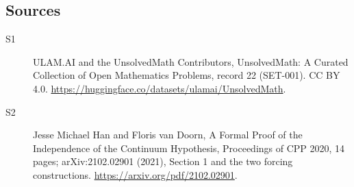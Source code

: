 \documentclass[11pt]{article}
\begin{document}
\subsection{Sources}
\begin{description}
\item[\hypertarget{source:22:1}{S1}] ULAM.AI and the UnsolvedMath Contributors, UnsolvedMath: A Curated Collection of Open Mathematics Problems, record 22 (SET-001). CC BY 4.0. \url{https://huggingface.co/datasets/ulamai/UnsolvedMath}.
\item[\hypertarget{source:22:2}{S2}] Jesse Michael Han and Floris van Doorn, A Formal Proof of the Independence of the Continuum Hypothesis, Proceedings of CPP 2020, 14 pages; arXiv:2102.02901 (2021), Section 1 and the two forcing constructions. \url{https://arxiv.org/pdf/2102.02901}.
\end{description}
\label{end:22}
\end{document}
